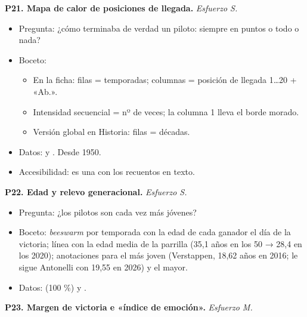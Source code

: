 \textbf{P21. Mapa de calor de posiciones de llegada.} \emph{Esfuerzo S.}

\begin{itemize}
\item Pregunta: ¿cómo terminaba de verdad un piloto: siempre en puntos o todo o nada?
\item Boceto:
\begin{itemize}
\item En la ficha: filas = temporadas; columnas = posición de llegada 1…20 + «Ab.».
\item Intensidad secuencial = nº de veces; la columna 1 lleva el borde morado.
\item Versión global en Historia: filas = décadas.
\end{itemize}
\item Datos:  y . Desde 1950.
\item Accesibilidad: es una  con los recuentos en texto.
\end{itemize}

\textbf{P22. Edad y relevo generacional.} \emph{Esfuerzo S.}

\begin{itemize}
\item Pregunta: ¿los pilotos son cada vez más jóvenes?
\item Boceto: \emph{beeswarm} por temporada con la edad de cada ganador el día de la victoria; línea con la edad media de la parrilla (35,1 años en los 50 → 28,4 en los 2020); anotaciones para el más joven (Verstappen, 18,62 años en 2016; le sigue Antonelli con 19,55 en 2026) y el mayor.
\item Datos:  (100 \%) y .
\end{itemize}

\textbf{P23. Margen de victoria e «índice de emoción».} \emph{Esfuerzo M.}

